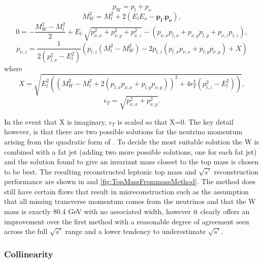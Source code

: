 \begin{equation}
  p_W=p_l+p_\nu
\end{equation}
\begin{equation}
M_W^2=M_l^2 + 2(E_lE_\nu - \mathbf{p_l.p_\nu}),
\end{equation}
\begin{equation}
0=-\frac{M_W^2-M_l^2}{2} + E_l.\sqrt{p^2_{\nu , x}+p^2_{\nu , y}+p^2_{\nu , z}} - (p_{\nu , x}p_{l , x}+p_{\nu , y}p_{l , y}+p_{\nu , z}p_{l , z}),
\end{equation}
\begin{equation}
p_{\nu , z}=\frac{1}{2(p^2_{l , x}-E^2_{l})} (p_{l , z}(M_l^2-M_W^2)-2p_{l , z}(p_{l , x}p_{\nu , x}+p_{l , y}p_{\nu , y}) + X)
\end{equation}
where
\begin{equation}
  \label{eq:X}
  X=\sqrt{E_l^2((M_W^2-M_l^2 +2(p_{l , x}p_{\nu , x}+p_{l , y}p_{\nu , y}))^2 +4\epsilon_T^2(p^2_{l , z}-E_l^2) )},
\end{equation}
\begin{equation}
  \epsilon_T=\sqrt{p^2_{\nu , x}+p^2_{\nu , y}}.
\end{equation}

In the event that X is imaginary, $\epsilon_T$ is scaled so that X=0. The key detail however, is that there are two possible solutions for the neutrino momentum arising from the quadratic form of . To decide the most suitable solution the W is combined with a fat jet (adding two more possible solutions, one for each fat jet) and the solution found to give an invariant mass closest to the top mass is chosen to be best. The resulting reconstructed leptonic top mass and $\sqrt{s'}$ reconstruction performance are shown in  and \ref{fig:TopMassFrommassMethod}. The method does still have certain flaws that result in misreconstruction such as the assumption that all missing transverse momentum comes from the neutrinos and that the W mass is exactly 80.4 GeV with no associated width, however it clearly offers an improvement over the first method with a reasonable degree of agreement seen across the full $\sqrt{s'}$ range and a lower tendency to underestimate $\sqrt{s'}$.

\subsubsection{Collinearity}


